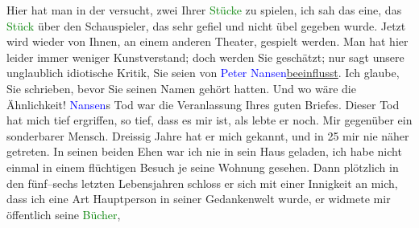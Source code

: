            {\pb}Hier hat man in der \label{K_L02303_1v}\label{K_L02303_1h} versucht, zwei
                    Ihrer \textcolor{green}{Stücke}{} zu
                    spielen, ich sah das eine, das \textcolor{green}{Stück}{} über den Schauspieler, das sehr gefiel und nicht übel gegeben
                    wurde. Jetzt wird wieder \label{K_L02303_2v}\label{K_L02303_2h} von Ihnen, an einem anderen
                    Theater, gespielt werden. Man hat hier leider immer weniger Kunstverstand; doch
                    werden Sie geschätzt; nur sagt unsere unglaublich idiotische Kritik, Sie seien
                    von \textcolor{blue}{Peter Nansen}{}\ledrightnote{\textcolor{blue}{Peter Nansen}}{ }\uline{beeinflusst}. Ich glaube, Sie schrieben, bevor
                    Sie seinen Namen gehört hatten. Und wo wäre die Ähnlichkeit!\pend
           \pstart
           \textcolor{blue}{Nansen}{}\ledrightnote{\textcolor{blue}{Peter Nansen}}s Tod war die Veranlassung Ihres guten
                    Briefes. Dieser Tod hat mich tief ergriffen, so tief, dass es mir ist, als lebte
                    er noch. Mir gegenüber ein sonderbarer Mensch. Dreissig Jahre hat er mich
                    gekannt, und \introOben{}in 25\introOben{} mir nie näher getreten. In seinen
                    beiden Ehen war ich nie in sein Haus geladen, ich habe nicht einmal in einem
                    flüchtigen Besuch je seine Wohnung {\pb}gesehen. Dann plötzlich in
                    den fünf–sechs letzten Lebensjahren schloss er sich mit einer Innigkeit an mich,
                    dass ich eine Art Hauptperson in seiner Gedankenwelt wurde, er widmete mir
                    öffentlich seine \textcolor{green}{Bücher}{},
